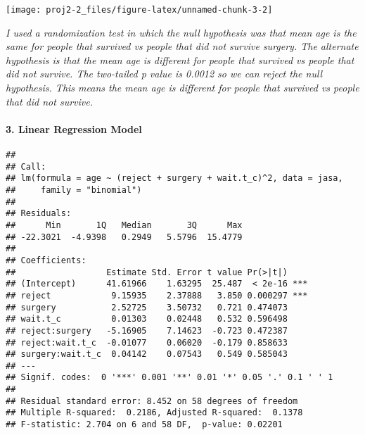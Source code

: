 \documentclass[]{article}
\newenvironment{Shaded}{\begin{snugshade}}{\end{snugshade}}
\newcommand{\DataTypeTok}[1]{\textcolor[rgb]{0.13,0.29,0.53}{#1}}
\newcommand{\DecValTok}[1]{\textcolor[rgb]{0.00,0.00,0.81}{#1}}
\newcommand{\KeywordTok}[1]{\textcolor[rgb]{0.13,0.29,0.53}{\textbf{#1}}}
\newcommand{\NormalTok}[1]{#1}
\newcommand{\OperatorTok}[1]{\textcolor[rgb]{0.81,0.36,0.00}{\textbf{#1}}}
\newcommand{\StringTok}[1]{\textcolor[rgb]{0.31,0.60,0.02}{#1}}
\let\oldparagraph\paragraph
\renewcommand{\paragraph}[1]{\oldparagraph{#1}\mbox{}}
\begin{document}
\begin{center}\texttt{[image: proj2-2\_files/figure-latex/unnamed-chunk-3-2]} \end{center}

\emph{I used a randomization test in which the null hypothesis was that
mean age is the same for people that survived vs people that did not
survive surgery. The alternate hypothesis is that the mean age is
different for people that survived vs people that did not survive. The
two-tailed p value is 0.0012 so we can reject the null hypothesis. This
means the mean age is different for people that survived vs people that
did not survive.}

\hypertarget{linear-regression-model}{%
\paragraph{3. Linear Regression Model}\label{linear-regression-model}}

\begin{Shaded}
\end{Shaded}

\begin{verbatim}
## 
## Call:
## lm(formula = age ~ (reject + surgery + wait.t_c)^2, data = jasa, 
##     family = "binomial")
## 
## Residuals:
##      Min       1Q   Median       3Q      Max 
## -22.3021  -4.9398   0.2949   5.5796  15.4779 
## 
## Coefficients:
##                  Estimate Std. Error t value Pr(>|t|)    
## (Intercept)      41.61966    1.63295  25.487  < 2e-16 ***
## reject            9.15935    2.37888   3.850 0.000297 ***
## surgery           2.52725    3.50732   0.721 0.474073    
## wait.t_c          0.01303    0.02448   0.532 0.596498    
## reject:surgery   -5.16905    7.14623  -0.723 0.472387    
## reject:wait.t_c  -0.01077    0.06020  -0.179 0.858633    
## surgery:wait.t_c  0.04142    0.07543   0.549 0.585043    
## ---
## Signif. codes:  0 '***' 0.001 '**' 0.01 '*' 0.05 '.' 0.1 ' ' 1
## 
## Residual standard error: 8.452 on 58 degrees of freedom
## Multiple R-squared:  0.2186, Adjusted R-squared:  0.1378 
## F-statistic: 2.704 on 6 and 58 DF,  p-value: 0.02201
\end{verbatim}
\end{document}
